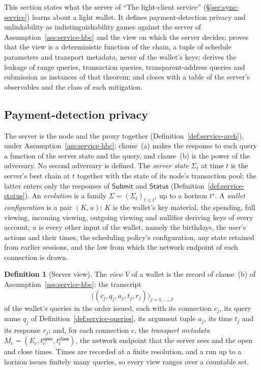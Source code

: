 \documentclass[11pt,a4paper]{article}
\theoremstyle{definition}
\newtheorem{definition}[theorem]{Definition}
\begin{document}
This section states what the server of ``The light-client service''
(\S\ref{sec:sync-service}) learns about a light wallet. It defines
payment-detection privacy and unlinkability as indistinguishability games
against the server of Assumption~\ref{ass:service-hbc} and the view on which
the server decides; proves that the view is a deterministic function of the
chain, a tuple of schedule parameters and transport metadata, never of the
wallet's keys; derives the leakage of range queries, transaction queries,
transparent-address queries and submission as instances of that theorem;
and closes with a table of the server's observables and the class of each
mitigation.

\subsection{Payment-detection privacy}\label{sec:priv-model}

The server is the node and the proxy together
(Definition~\ref{def:service-arch}), under
Assumption~\ref{ass:service-hbc}: clause~(a) makes the response to each
query a function of the server state and the query, and clause~(b) is the
power of the adversary. No second adversary is defined. The \emph{server
state} $\Sigma_t$ at time $t$ is the server's best chain at $t$ together
with the state of its node's transaction pool; the latter enters only the
responses of $\mathsf{Submit}$ and $\mathsf{Status}$
(Definition~\ref{def:service-status}). An \emph{evolution} is a family
$\Sigma = (\Sigma_t)_{t \le t^{\star}}$ up to a horizon $t^{\star}$. A
\emph{wallet configuration} is a pair $(K, u)$: $K$ is the wallet's key
material, the spending, full viewing, incoming viewing, outgoing viewing
and nullifier deriving keys of every account; $u$ is every other input of
the wallet, namely the birthdays, the user's actions and their times, the
scheduling policy's configuration, any state retained from earlier
sessions, and the law from which the network endpoint of each connection is
drawn.

\begin{definition}[Server view]\label{def:priv-view}
The \emph{view} $V$ of a wallet is the record of clause~(b) of
Assumption~\ref{ass:service-hbc}: the transcript
\[
  \bigl((c_j, q_j, a_j, t_j, r_j)\bigr)_{j = 1, \dots, J}
\]
of the wallet's queries in the order issued, each with its connection
$c_j$, its query name $q_j$ of Definition~\ref{def:service-queries}, its
argument tuple $a_j$, its time $t_j$ and its response $r_j$; and, for each
connection $c$, the \emph{transport metadata}
$M_c = (E_c, t^{\mathsf{open}}_c, t^{\mathsf{close}}_c)$, the network
endpoint that the server sees and the open and close times. Times are
recorded at a finite resolution, and a run up to a horizon issues finitely
many queries, so every view ranges over a countable set.
\end{definition}
\end{document}
